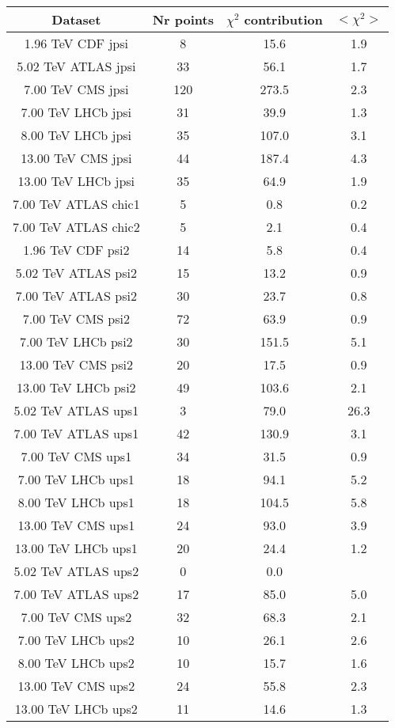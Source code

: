 \begin{table}[h!]
\centering
\begin{tabular}{c|c|c|c}
Dataset & Nr points & $\chi^2$ contribution & $<\chi^2>$ \\
\hline
1.96 TeV CDF jpsi & 8 & 15.6 & 1.9 \\
5.02 TeV ATLAS jpsi & 33 & 56.1 & 1.7 \\
7.00 TeV CMS jpsi & 120 & 273.5 & 2.3 \\
7.00 TeV LHCb jpsi & 31 & 39.9 & 1.3 \\
8.00 TeV LHCb jpsi & 35 & 107.0 & 3.1 \\
13.00 TeV CMS jpsi & 44 & 187.4 & 4.3 \\
13.00 TeV LHCb jpsi & 35 & 64.9 & 1.9 \\
7.00 TeV ATLAS chic1 & 5 & 0.8 & 0.2 \\
7.00 TeV ATLAS chic2 & 5 & 2.1 & 0.4 \\
1.96 TeV CDF psi2 & 14 & 5.8 & 0.4 \\
5.02 TeV ATLAS psi2 & 15 & 13.2 & 0.9 \\
7.00 TeV ATLAS psi2 & 30 & 23.7 & 0.8 \\
7.00 TeV CMS psi2 & 72 & 63.9 & 0.9 \\
7.00 TeV LHCb psi2 & 30 & 151.5 & 5.1 \\
13.00 TeV CMS psi2 & 20 & 17.5 & 0.9 \\
13.00 TeV LHCb psi2 & 49 & 103.6 & 2.1 \\
5.02 TeV ATLAS ups1 & 3 & 79.0 & 26.3 \\
7.00 TeV ATLAS ups1 & 42 & 130.9 & 3.1 \\
7.00 TeV CMS ups1 & 34 & 31.5 & 0.9 \\
7.00 TeV LHCb ups1 & 18 & 94.1 & 5.2 \\
8.00 TeV LHCb ups1 & 18 & 104.5 & 5.8 \\
13.00 TeV CMS ups1 & 24 & 93.0 & 3.9 \\
13.00 TeV LHCb ups1 & 20 & 24.4 & 1.2 \\
5.02 TeV ATLAS ups2 & 0 & 0.0 &  \\
7.00 TeV ATLAS ups2 & 17 & 85.0 & 5.0 \\
7.00 TeV CMS ups2 & 32 & 68.3 & 2.1 \\
7.00 TeV LHCb ups2 & 10 & 26.1 & 2.6 \\
8.00 TeV LHCb ups2 & 10 & 15.7 & 1.6 \\
13.00 TeV CMS ups2 & 24 & 55.8 & 2.3 \\
13.00 TeV LHCb ups2 & 11 & 14.6 & 1.3 \\

\end{tabular}
\end{table}
